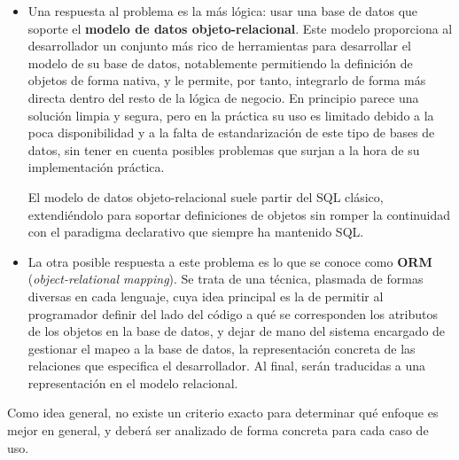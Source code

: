 \documentclass[12pt, a4paper]{article}
\begin{document}
\begin{itemize}

    \item Una respuesta al problema es la más lógica: usar una base de datos que soporte el \textbf{modelo de datos objeto-relacional}. Este modelo proporciona al desarrollador un conjunto más rico de herramientas para desarrollar el modelo de su base de datos, notablemente permitiendo la definición de objetos de forma nativa, y le permite, por tanto, integrarlo de forma más directa dentro del resto de la lógica de negocio. En principio parece una solución limpia y segura, pero en la práctica su uso es limitado debido a la poca disponibilidad y a la falta de estandarización de este tipo de bases de datos, sin tener en cuenta posibles problemas que surjan a la hora de su implementación práctica.
    
    El modelo de datos objeto-relacional suele partir del SQL clásico, extendiéndolo para soportar definiciones de objetos sin romper la continuidad con el paradigma declarativo que siempre ha mantenido SQL.
    
    \item La otra posible respuesta a este problema es lo que se conoce como \textbf{ORM} (\textit{object-relational mapping}). Se trata de una técnica, plasmada de formas diversas en cada lenguaje, cuya idea principal es la de permitir al programador definir del lado del código a qué se corresponden los atributos de los objetos en la base de datos, y dejar de mano del sistema encargado de gestionar el mapeo a la base de datos, la representación concreta de las relaciones que especifica el desarrollador. Al final, serán traducidas a una representación en el modelo relacional.
    
\end{itemize}

Como idea general, no existe un criterio exacto para determinar qué enfoque es mejor en general, y deberá ser analizado de forma concreta para cada caso de uso.

\nocite{*}

\end{document}
